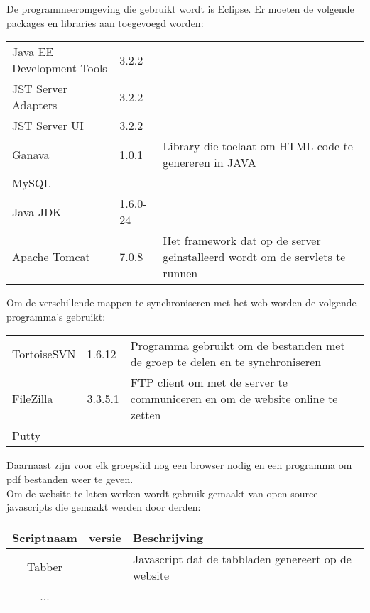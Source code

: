 \documentclass{article}
\begin{document}
De programmeeromgeving die gebruikt wordt is Eclipse. Er moeten de volgende packages en libraries aan toegevoegd worden:
\begin{center}
\begin{tabular}{|p{4cm}|p{1.5cm}|p{6cm}|}
\hline
Java EE Development Tools & 3.2.2 &   \\
\hdashline[1pt/5pt]    
JST Server Adapters & 3.2.2 &  \\
\hdashline[1pt/5pt] 
JST Server UI & 3.2.2 &  \\
\hdashline[1pt/5pt] 
Ganava & 1.0.1 & Library die toelaat om HTML code te genereren in JAVA \\
\hdashline[1pt/5pt] 
MySQL & & \\
\hline
Java JDK & 1.6.0-24 &  \\
\hdashline[1pt/5pt] 
Apache Tomcat & 7.0.8 & Het framework dat op de server geinstalleerd wordt om de servlets te runnen \\
\hline
\end{tabular}
\end{center}

Om de verschillende mappen te synchroniseren met het web worden de volgende programma's gebruikt:
\begin{center}
\begin{tabular}{|p{4cm}|p{1.5cm}|p{6cm}|}
\hline
TortoiseSVN & 1.6.12 & Programma gebruikt om de bestanden met de groep te delen en te synchroniseren \\
\hdashline[1pt/5pt] 
FileZilla & 3.3.5.1 & FTP client om met de server te communiceren en om de website online te zetten \\
\hdashline[1pt/5pt] 
Putty & & \\
\hline
\end{tabular}
\end{center}

Daarnaast zijn voor elk groepslid nog een browser nodig en een programma om pdf bestanden weer te geven.\\
Om de website te laten werken wordt gebruik gemaakt van open-source javascripts die gemaakt werden door derden:

\begin{center}
\begin{tabular}{|c|c|p{9cm}|}
\hline
Scriptnaam & versie & Beschrijving \\
\hline
\hline
Tabber & & Javascript dat de tabbladen genereert op de website \\
... & & \\
\hline
\end{tabular}
\end{center}
\end{document}
